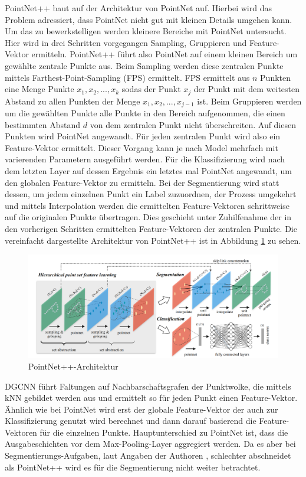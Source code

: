 \documentclass[12pt,titlepage, twoside]{article}
\begin{document}
PointNet++ baut auf der Architektur von PointNet auf. Hierbei wird das Problem adressiert, dass PointNet nicht gut mit kleinen Details umgehen kann. 
Um das zu bewerkstelligen werden kleinere Bereiche mit PointNet untersucht. Hier wird in drei Schritten vorgegangen Sampling, Gruppieren und Feature-Vektor ermitteln.
PointNet++ führt also PointNet auf einem kleinen Bereich um gewählte zentrale Punkte aus. Beim Sampling werden diese zentralen Punkte mittels Farthest-Point-Sampling (FPS) ermittelt. 
FPS ermittelt aus $n$ Punkten eine Menge Punkte ${x_1,x_2,...,x_k}$ sodas der Punkt $x_j$ der Punkt mit dem weitesten Abstand zu allen Punkten der Menge ${x_1,x_2,...,x_{j-1}}$ ist.
Beim Gruppieren werden um die gewählten Punkte alle Punkte in den Bereich aufgenommen, die einen bestimmten Abstand $d$ von dem zentralen Punkt nicht überschreiten. 
Auf diesen Punkten wird PointNet angewandt. Für jeden zentralen Punkt wird also ein Feature-Vektor ermittelt.
Dieser Vorgang kann je nach Model mehrfach mit varierenden Parametern ausgeführt werden. 
Für die Klassifizierung wird nach dem letzten Layer auf dessen Ergebnis ein letztes mal PointNet angewandt, um den globalen Feature-Vektor zu ermitteln.
Bei der Segmentierung wird statt dessen, um jedem einzelnen Punkt ein Label zuzuordnen, der Prozess umgekehrt und mittels Interpolation werden die ermittelten Feature-Vektoren schrittweise auf die originalen Punkte 
übertragen. Dies geschieht unter Zuhilfenahme der in den vorherigen Schritten ermittelten Feature-Vektoren der zentralen Punkte.
Die vereinfacht dargestellte Architektur von PointNet++ ist in Abbildung \ref{fig:point:net:pp:arch} zu sehen.

\begin{figure}
    \centering
    \includegraphics[width=1.0\textwidth]{./Images/PointNetPPArchitektur.png}
    \caption{PointNet++-Architektur \cite{qi2017pointnet++}}
    \label{fig:point:net:pp:arch}
\end{figure}

DGCNN führt Faltungen auf Nachbarschaftsgrafen der Punktwolke, die mittels kNN gebildet werden aus und ermittelt so für jeden Punkt einen Feature-Vektor. 
Ähnlich wie bei PointNet wird erst der globale Feature-Vektor der auch zur Klassifizierung genutzt wird berechnet und dann darauf basierend die Feature-Vektoren für die einzelnen Punkte.
Hauptunterschied zu PointNet ist, dass die Ausgabeschichten vor dem Max-Pooling-Layer aggregiert werden.
Da es aber bei Segmentierungs-Aufgaben, laut Angaben der Authoren \cite{dgcnn}, schlechter abschneidet als PointNet++ wird es für die Segmentierung nicht weiter betrachtet.
\end{document}
